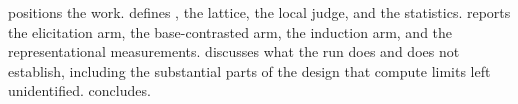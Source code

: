   positions the work.  defines \msp, the lattice, the local judge, and the statistics.  reports the elicitation arm, the base-contrasted arm, the induction arm, and the representational measurements.  discusses what the run does and does not establish, including the substantial parts of the design that compute limits left unidentified.  concludes.
